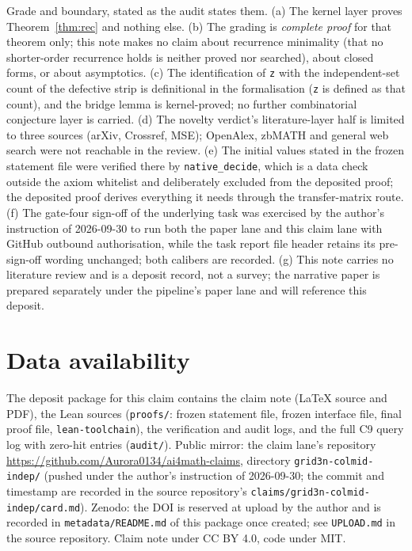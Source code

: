 \documentclass[11pt]{article}
\begin{document}
Grade and boundary, stated as the audit states them. (a) The kernel layer
proves Theorem~\ref{thm:rec} and nothing else. (b) The grading is
\emph{complete proof} for that theorem only; this note makes no claim about
recurrence minimality (that no shorter-order recurrence holds is neither
proved nor searched), about closed forms, or about asymptotics. (c) The
identification of \texttt{z} with the independent-set count of the
defective strip is definitional in the formalisation (\texttt{z} is defined
as that count), and the bridge lemma is kernel-proved; no further
combinatorial conjecture layer is carried. (d) The novelty verdict's
literature-layer half is limited to three sources (arXiv, Crossref, MSE);
OpenAlex, zbMATH and general web search were not reachable in the review.
(e) The initial values stated in the frozen statement file were verified
there by \texttt{native\_decide}, which is a data check outside the axiom
whitelist and deliberately excluded from the deposited proof; the deposited
proof derives everything it needs through the transfer-matrix route.
(f) The gate-four sign-off of the underlying task was exercised by the
author's instruction of 2026-09-30 to run both the paper lane and this
claim lane with GitHub outbound authorisation, while the task report file
header retains its pre-sign-off wording unchanged; both calibers are
recorded. (g) This note carries no literature review and is a deposit
record, not a survey; the narrative paper is prepared separately under the
pipeline's paper lane and will reference this deposit.

\section*{Data availability}

The deposit package for this claim contains the claim note (LaTeX source and
PDF), the Lean sources (\texttt{proofs/}: frozen statement file, frozen
interface file, final proof file, \texttt{lean-toolchain}), the verification
and audit logs, and the full C9 query log with zero-hit entries
(\texttt{audit/}). Public mirror: the claim lane's repository
\url{https://github.com/Aurora0134/ai4math-claims}, directory
\texttt{grid3n-colmid-indep/} (pushed under the author's instruction of
2026-09-30; the commit and timestamp are recorded in the source
repository's \texttt{claims/grid3n-colmid-indep/card.md}). Zenodo: the DOI
is reserved at upload by the author and is recorded in
\texttt{metadata/README.md} of this package once created; see
\texttt{UPLOAD.md} in the source repository. Claim note under CC BY 4.0,
code under MIT.
\end{document}
